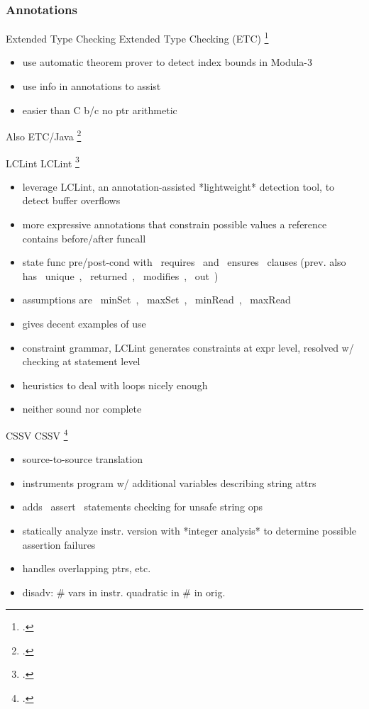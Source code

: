 \documentclass[aspectratio=169]{beamer}
\begin{document}
\subsubsection{Annotations}

\begin{frame}[fragile]{Extended Type Checking}
Extended Type Checking (ETC) \footcite{detlefs_overview_1995}
    \begin{itemize}
      \item use automatic theorem prover to detect index bounds in Modula-3
      \item use info in annotations to assist
      \item easier than C b/c no ptr arithmetic
    \end{itemize}
Also ETC/Java \footcite{flanagan_extended_2002}
\end{frame}

\begin{frame}[fragile]{LCLint}
LCLint \footcite{larochelle_statically_2001}
\begin{itemize}
    \item leverage LCLint, an annotation-assisted *lightweight* detection tool, to detect buffer overflows
    \item more expressive annotations that constrain possible values a reference contains before/after funcall
    \item state func pre/post-cond with ~requires~ and ~ensures~ clauses (prev. also has ~unique~, ~returned~, ~modifies~, ~out~)
    \item assumptions are ~minSet~, ~maxSet~, ~minRead~, ~maxRead~
    \item gives decent examples of use
    \item constraint grammar, LCLint generates constraints at expr level, resolved w/ checking at statement level
    \item heuristics to deal with loops nicely enough
    \item neither sound nor complete
\end{itemize}
\end{frame}

\begin{frame}[fragile]{CSSV}
CSSV \footcite{dor_cssv:_2003}
\begin{itemize}
    \item source-to-source translation
    \item instruments program w/ additional variables describing string attrs
    \item adds ~assert~ statements checking for unsafe string ops
    \item statically analyze instr. version with *integer analysis* to determine possible assertion failures
    \item handles overlapping ptrs, etc.
    \item  disadv: \# vars in instr. quadratic in \# in orig.
\end{itemize}
\end{frame}
\end{document}
